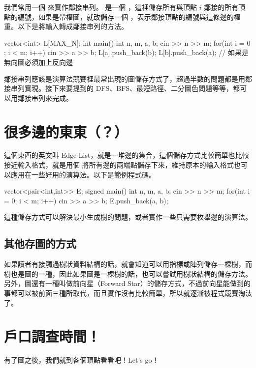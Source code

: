 我們常用一個  來實作鄰接串列。  是一個 ，這裡儲存所有與頂點 $i$ 鄰接的所有頂點的編號，如果是帶權圖，就改儲存一個 ，表示鄰接頂點的編號與這條邊的權重。以下是將輸入轉成鄰接串列的方法。

\begin{C++}
vector<int> L[MAX_N];
int main(){
    int n, m, a, b;
    cin >> n >> m;
    for(int i = 0 ; i < m; i++){
        cin >> a >> b;
        L[a].push_back(b);
        L[b].push_back(a); // 如果是無向圖必須加上反向邊
    }
}
\end{C++}

鄰接串列應該是演算法競賽裡最常出現的圖儲存方式了，超過半數的問題都是用鄰接串列實現。接下來要提到的 DFS、BFS、最短路徑、二分圖色問題等等，都可以用鄰接串列來完成。

\section{很多邊的東東（？）}
這個東西的英文叫 Edge List，就是一堆邊的集合，這個儲存方式比較簡單也比較接近輸入格式，就是用個  將所有邊的兩端點儲存下來，維持原本的輸入格式也可以應用在一些好用的演算法。以下是範例程式碼。

\begin{C++}
vector<pair<int,int>> E;
signed main(){
    int n, m, a, b;
    cin >> n >> m;
    for(int i = 0; i < m; i++){
        cin >> a >> b;
        E.push_back({a, b});
    }
}
\end{C++}

這種儲存方式可以解決最小生成樹的問題，或者實作一些只需要枚舉邊的演算法。

\subsection{其他存圖的方式}
如果讀者有接觸過樹狀資料結構的話，就會知道可以用指標或陣列儲存一棵樹，而樹也是圖的一種，因此如果圖是一棵樹的話，也可以嘗試用樹狀結構的儲存方法。\\

另外，圖還有一種叫做前向星（Forward Star）的儲存方式，不過前向星能做到的事都可以被前面三種所取代，而且實作沒有比較簡單，所以就逐漸被程式競賽淘汰了。

\section{戶口調查時間！}
有了圖之後，我們就到各個頂點看看吧！Let's go！\\

